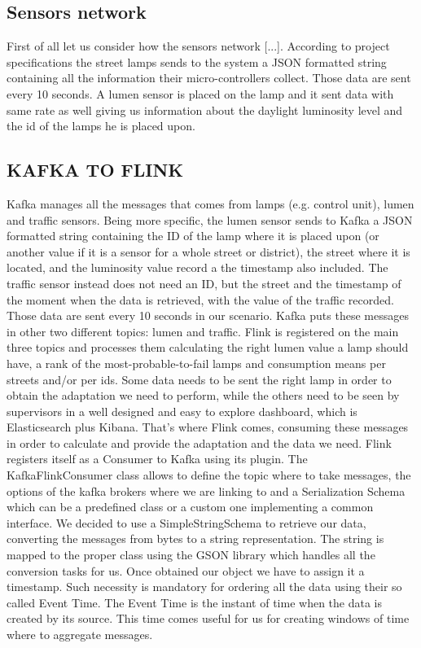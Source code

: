\subsection{Sensors network}
First of all let us consider how the sensors network [...]. According to project specifications the street lamps sends to the system a JSON formatted string containing all the information their micro-controllers collect. Those data are sent every 10 seconds. A lumen sensor is placed on the lamp and it sent data with same rate as well giving us information about the daylight luminosity level and the id of the lamps he is placed upon.

\subsection{KAFKA TO FLINK}
Kafka manages all the messages that comes from lamps (e.g. control unit), lumen and traffic sensors. Being more specific, the lumen sensor sends to Kafka a JSON formatted string containing the ID of the lamp where it is placed upon (or another value if it is a sensor for a whole street or district), the street where it is located, and the luminosity value record a the timestamp also included. The traffic sensor instead does not need an ID, but the street and the timestamp of the moment when the data is retrieved, with the value of the traffic recorded. Those data are sent every 10 seconds in our scenario. Kafka puts these messages in other two different topics: lumen and traffic. Flink is registered on the main three topics and processes them calculating the right lumen value a lamp should have, a rank of the most-probable-to-fail lamps and consumption means per streets and/or per ids. Some data needs to be sent the right lamp in order to obtain the adaptation we need to perform, while the others need to be seen by supervisors in a well designed and easy to explore dashboard, which is Elasticsearch plus Kibana. That’s where Flink comes, consuming these messages in order to calculate and provide the adaptation and the data we need. Flink registers itself as a Consumer to Kafka using its plugin. The KafkaFlinkConsumer class allows to define the topic where to take messages, the options of the kafka brokers where we are linking to and a Serialization Schema which can be a predefined class or a custom one implementing a common interface. We decided to use a SimpleStringSchema to retrieve our data, converting the messages from bytes to a string representation. The string is mapped to the proper class using the GSON library which handles all the conversion tasks for us. Once obtained our object we have to assign it a timestamp. Such necessity is mandatory for ordering all the data using their so called Event Time. The Event Time is the instant of time when the data is created by its source. This time comes useful for us for creating windows of time where to aggregate messages.


